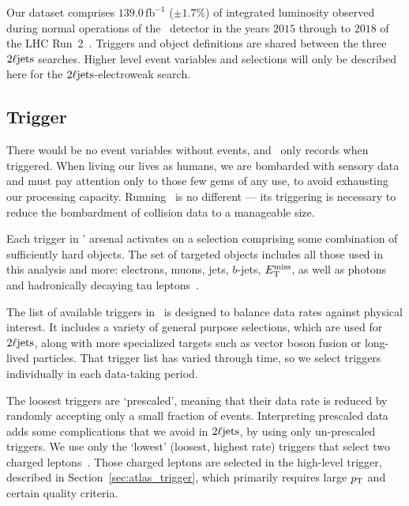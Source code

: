 Our dataset comprises $139.0\,\mathrm{fb}^{-1}$ ($\pm 1.7\%$) of integrated
luminosity observed during normal operations of the \atlas\ detector in the
years $2015$ through to $2018$ of the LHC Run~2~\cite{DAPR-2018-01}.
Triggers and object definitions are shared between the three $2\ell\mathrm{jets}$
searches.
Higher level event variables and selections will only be described here for the
$2\ell\mathrm{jets}$-electroweak search.


\subsection{Trigger}
\label{sec:2ljets_trigger}
There would be no event variables without events, and \atlas\ only records
when triggered.
When living our lives as humans, we are bombarded with sensory data and must
pay attention only to those few gems of any use, to avoid exhausting our
processing capacity.
Running \atlas\ is no different --- its triggering is necessary to reduce the
bombardment of collision data to a manageable size.

Each trigger in \atlas' arsenal activates on a selection comprising some
combination of sufficiently hard objects.
The set of targeted objects includes all those used in this analysis and more:
electrons, muons, jets, $b$-jets, $E_\mathrm{T}^\mathrm{miss}$, as well as photons and hadronically
decaying tau leptons~\cite{atlas_PERF_2007_01}.

The list of available triggers in \atlas\ is designed to balance data rates
against physical interest.
It includes a variety of general purpose selections, which are used for
$2\ell\mathrm{jets}$, along with more specialized targets such as vector boson fusion
or long-lived particles.
That trigger list has varied through time, so we select triggers individually
in each data-taking period.

The loosest triggers are `prescaled', meaning that their data rate is reduced
by randomly accepting only a small fraction of events.
Interpreting prescaled data adds some complications that we avoid in
$2\ell\mathrm{jets}$, by using only un-prescaled triggers.
We use only the `lowest' (loosest, highest rate) triggers that select two
charged leptons~\cite{atlas_twiki_lowest_unprescaled}.
Those charged leptons are selected in the high-level trigger,
described in Section~\ref{sec:atlas_trigger}, which
primarily requires large $p_\mathrm{T}$ and certain quality criteria.


